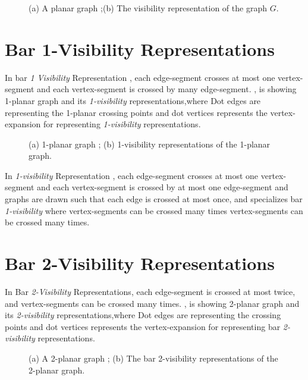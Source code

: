 \begin{figure}[!tb]
  \centering
\resizebox{150mm}{!}{}
\caption{(a) A planar graph ;(b) The visibility representation of the graph $G$.}
\label{fig:v}
\end{figure}



\section{Bar 1-Visibility Representations}
\label{sec:b1}


In bar \emph{1 Visibility} Representation , each edge-segment crosses at most one vertex-segment and each vertex-segment is crossed by many edge-segment.
 , is showing 1-planar graph and its \emph{1-visibility} representations,where Dot edges are representing the 1-planar crossing points and dot vertices represents the vertex-expansion for representing \emph{1-visibility} representations. 


\begin{figure}[!tb]
  \centering
\resizebox{150mm}{!}{}
\caption{(a) 1-planar graph ; (b) 1-visibility representations of the 1-planar graph.}
\label{fig:1v}
\end{figure}

In \emph{1-visibility} Representation \cite{FJ}, each edge-segment crosses at most one vertex-segment and each vertex-segment is crossed by at most one edge-segment and graphs are drawn such that each edge is crossed at most once, and specializes bar \emph{1-visibility} where vertex-segments can be crossed many times vertex-segments can be crossed many times.



\section{Bar 2-Visibility Representations}
\label{sec:b2}
In Bar \emph{2-Visibility} Representations, each edge-segment is crossed at most twice, and  vertex-segments can be crossed many times. , is showing 2-planar graph and its \emph{2-visibility} representations,where Dot edges are representing the crossing points and dot vertices represents the vertex-expansion for representing bar \emph{2-visibility} representations.


\begin{figure}[!tb]
\centering
\resizebox{150mm}{!}{}
\caption{(a) A 2-planar graph ; (b) The bar 2-visibility representations of the 2-planar graph.}
\label{fig:2v}
\end{figure}





